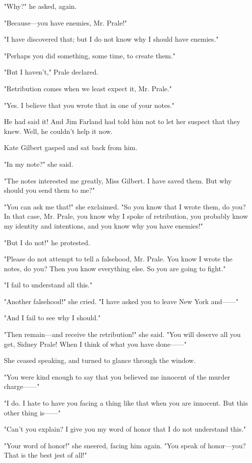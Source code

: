 \documentclass{novel}
\begin{document}
"Why?" he asked, again.

"Because---you have enemies, Mr. Prale!"

"I have discovered that; but I do not know why I should have enemies."

"Perhaps you did something, some time, to create them."

"But I haven't," Prale declared.

"Retribution comes when we least expect it, Mr. Prale."

"Yes. I believe that you wrote that in one of your notes."

He had said it! And Jim Farland had told him not to let her suspect that they knew. Well, he couldn't help it now.

Kate Gilbert gasped and sat back from him.

"In my note?" she said.

"The notes interested me greatly, Miss Gilbert. I have saved them. But why should you send them to me?"

"You can ask me that!" she exclaimed. "So you know that I wrote them, do you? In that case, Mr. Prale, you know why I spoke of retribution, you probably know my identity and intentions, and you know why you have enemies!"

"But I do not!" he protested.

"Please do not attempt to tell a falsehood, Mr. Prale. You know I wrote the notes, do you? Then you know everything else. So you are going to fight."

"I fail to understand all this."

"Another falsehood!" she cried. "I have asked you to leave New York and------"

"And I fail to see why I should."

"Then remain---and receive the retribution!" she said. "You will deserve all you get, Sidney Prale! When I think of what you have done------"

She ceased speaking, and turned to glance through the window.

"You were kind enough to say that you believed me innocent of the murder charge------"

"I do. I hate to have you facing a thing like that when you are innocent. But this other thing is------"

"Can't you explain? I give you my word of honor that I do not understand this."

"Your word of honor!" she sneered, facing him again. "You speak of honor---you? That is the best jest of all!"
\end{document}
